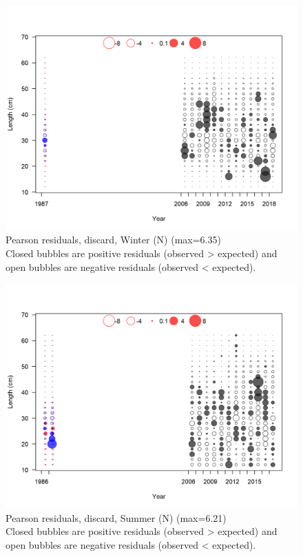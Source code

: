 \documentclass[12pt,]{article}
\begin{document}
\FloatBarrier

\begin{figure}
\centering
\includegraphics{r4ss/plots_mod1/comp_lenfit_residsflt1mkt1.png}
\caption{Pearson residuals, discard, Winter (N) (max=6.35)\\
Closed bubbles are positive residuals (observed \textgreater{} expected)
and open bubbles are negative residuals (observed \textless{} expected).
\label{fig:discard_wn_len_pearson}}
\end{figure}

\begin{figure}
\centering
\includegraphics{r4ss/plots_mod1/comp_lenfit_residsflt2mkt1.png}
\caption{Pearson residuals, discard, Summer (N) (max=6.21)\\
Closed bubbles are positive residuals (observed \textgreater{} expected)
and open bubbles are negative residuals (observed \textless{} expected).
\label{fig:discard_sn_len_pearson}}
\end{figure}
\end{document}
